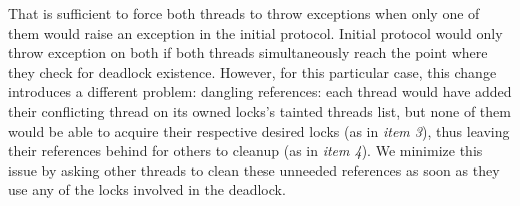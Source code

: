 That is sufficient to force both threads to throw exceptions when only one of them would raise an exception in the initial protocol. Initial protocol would only throw exception on both if both threads simultaneously reach the point where they check for deadlock existence. However, for this particular case, this change introduces a different problem: dangling references:
each thread would have added their conflicting thread on its owned locks's tainted threads list,
but none of them would be able to acquire their respective desired locks (as in \emph{item 3}),
thus leaving their references behind for others to cleanup (as in \emph{item 4}). We minimize this issue by asking other threads to clean these unneeded references as soon as they use any of the locks involved in the deadlock.

%
%
%
%
%
